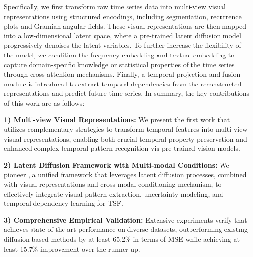 Specifically, we first transform raw time series data into multi-view visual representations using structured encodings, including segmentation, recurrence plots and Gramian angular fields. These visual representations are then mapped into a low-dimensional latent space, where a pre-trained latent diffusion model progressively denoises the latent variables. To further increase the flexibility of the model, we condition the frequency embedding and textual embedding to capture domain-specific knowledge or statistical properties of the time series through cross-attention mechanisms. Finally, a temporal projection and fusion module is introduced to extract temporal dependencies from the reconstructed representations and predict future time series. In summary, the key contributions of this work are as follows:

\noindent \textbf{1) Multi-view Visual Representations:} 
We present the first work that utilizes complementary strategies to transform temporal features into multi-view visual representations, enabling both crucial temporal property preservation and enhanced complex temporal pattern recognition via pre-trained vision models.

\noindent \textbf{2) Latent Diffusion Framework with Multi-modal Conditions:} We pioneer \model, a unified framework that leverages latent diffusion processes, combined with visual representations and cross-modal conditioning mechanism, to effectively integrate visual pattern extraction, uncertainty modeling, and temporal dependency learning for TSF.

\noindent \textbf{3) Comprehensive Empirical Validation:} Extensive experiments verify that \model achieves state-of-the-art performance on diverse datasets, outperforming existing diffusion-based methods by at least 65.2\% in terms of MSE while achieving at least 15.7\% improvement over the runner-up.
